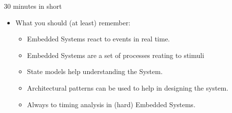 \documentclass[ngerman={babel}, utf8, bigger, xcolor={table,dvipsnames}, ompress, hyperref={bookmarks,colorlinks}]{beamer}
\begin{document}
\begin{frame}{30 minutes in short}
	\begin{itemize}
		\item What you should (at least) remember:
		\begin{itemize}
			\item Embedded Systems react to events in real time.
			\item Embedded Systems are a set of processes reating to stimuli
			\item State models help understanding the System.
			\item Architectural patterns can be used to help in designing the system.
			\item Always to timing analysis in (hard) Embedded Systems.
		\end{itemize}
	\end{itemize}
\end{frame}
\end{document}

